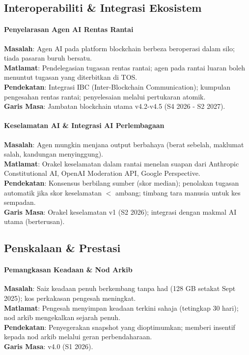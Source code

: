 \documentclass[11pt]{article}
\begin{document}
\subsection{Interoperabiliti \& Integrasi Ekosistem}

\paragraph{Penyelarasan Agen AI Rentas Rantai}
\textbf{Masalah}: Agen AI pada platform blockchain berbeza beroperasi dalam silo; tiada pasaran buruh bersatu.\\
\textbf{Matlamat}: Pendelegasian tugasan rentas rantai; agen pada rantai luaran boleh menuntut tugasan yang diterbitkan di TOS.\\
\textbf{Pendekatan}: Integrasi IBC (Inter-Blockchain Communication); kumpulan pengesahan rentas rantai; penyelesaian melalui pertukaran atomik.\\
\textbf{Garis Masa}: Jambatan blockchain utama v4.2-v4.5 (S4 2026 - S2 2027).

\paragraph{Keselamatan AI \& Integrasi AI Perlembagaan}
\textbf{Masalah}: Agen mungkin menjana output berbahaya (berat sebelah, maklumat salah, kandungan menyinggung).\\
\textbf{Matlamat}: Orakel keselamatan dalam rantai menelan suapan dari Anthropic Constitutional AI, OpenAI Moderation API, Google Perspective.\\
\textbf{Pendekatan}: Konsensus berbilang sumber (skor median); penolakan tugasan automatik jika skor keselamatan $<$ ambang; timbang tara manusia untuk kes sempadan.\\
\textbf{Garis Masa}: Orakel keselamatan v1 (S2 2026); integrasi dengan makmal AI utama (berterusan).

\subsection{Penskalaan \& Prestasi}

\paragraph{Pemangkasan Keadaan \& Nod Arkib}
\textbf{Masalah}: Saiz keadaan penuh berkembang tanpa had (128 GB setakat Sept 2025); kos perkakasan pengesah meningkat.\\
\textbf{Matlamat}: Pengesah menyimpan keadaan terkini sahaja (tetingkap 30 hari); nod arkib mengekalkan sejarah penuh.\\
\textbf{Pendekatan}: Penyegerakan snapshot yang dioptimumkan; memberi insentif kepada nod arkib melalui geran perbendaharaan.\\
\textbf{Garis Masa}: v4.0 (S1 2026).
\end{document}
